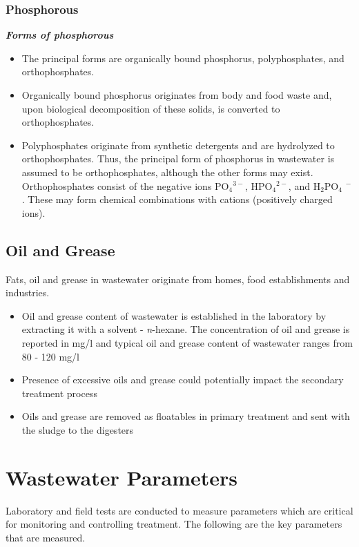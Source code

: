 		\subsubsection{Phosphorous}			
\textbf{\textit{Forms of phosphorous}}
					      \begin{itemize}
					      	\item The principal forms are organically bound phosphorus, polyphosphates, and orthophosphates.
					      	\item Organically bound phosphorus originates from body and food waste and, upon biological decomposition of these solids, is converted to orthophosphates. 
					      	\item Polyphosphates originate from synthetic detergents and are hydrolyzed to orthophosphates. Thus, the principal form of phosphorus in wastewater is assumed to be orthophosphates, although the other forms may exist. Orthophosphates consist of the negative ions PO$_4$$^{3-}$, HPO$_4$$^{2-}$, and H$_2$PO$_4$ $^-$.  These may form chemical combinations with cations (positively charged ions).
					      \end{itemize}

\subsection{Oil and Grease}	
			Fats, oil and grease in wastewater originate from homes, food establishments and industries.
			\begin{itemize}
				\item Oil and grease content of wastewater is established in the laboratory by extracting it with a solvent - \textit{n}-hexane.  The concentration of oil and grease is reported in mg/l and typical oil and grease content of wastewater ranges from 80 - 120 mg/l
				\item Presence of excessive oils and grease could potentially impact the secondary treatment process
				\item Oils and grease are removed as floatables in primary treatment and sent with the sludge to the digesters
			\end{itemize}
		



\section{Wastewater Parameters}			
		Laboratory and field tests are conducted to measure parameters which are critical for monitoring and controlling treatment.  The following are the key parameters that are measured.	
			
